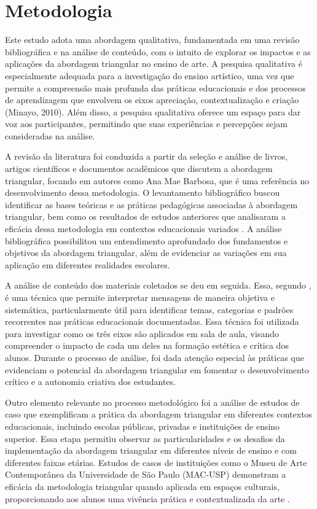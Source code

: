 \documentclass[portuguese]{textolivre}
\begin{document}
\section{Metodologia}\label{sec-conduta}
Este estudo adota uma abordagem qualitativa, fundamentada em uma revisão bibliográfica e na análise de conteúdo, com o intuito de explorar os impactos e as aplicações da abordagem triangular no ensino de arte. A pesquisa qualitativa é especialmente adequada para a investigação do ensino artístico, uma vez que permite a compreensão mais profunda das práticas educacionais e dos processos de aprendizagem que envolvem os eixos apreciação, contextualização e criação (Minayo, 2010). Além disso, a pesquisa qualitativa oferece um espaço para dar voz aos participantes, permitindo que suas experiências e percepções sejam consideradas na análise.

A revisão da literatura foi conduzida a partir da seleção e análise de livros, artigos científicos e documentos acadêmicos que discutem a abordagem triangular, focando em autores como Ana Mae Barbosa, que é uma referência no desenvolvimento dessa metodologia. O levantamento bibliográfico buscou identificar as bases teóricas e as práticas pedagógicas associadas à abordagem triangular, bem como os resultados de estudos anteriores que analisaram a eficácia dessa metodologia em contextos educacionais variados \cite{barbosa2010arte,hernandez2000educacao}. A análise bibliográfica possibilitou um entendimento aprofundado dos fundamentos e objetivos da abordagem triangular, além de evidenciar as variações em sua aplicação em diferentes realidades escolares.

A análise de conteúdo dos materiais coletados se deu em seguida. Essa, segundo \textcite{bardin2011analise}, é uma técnica que permite interpretar mensagens de maneira objetiva e sistemática, particularmente útil para identificar temas, categorias e padrões recorrentes nas práticas educacionais documentadas. Essa técnica foi utilizada para investigar como os três eixos são aplicados em sala de aula, visando compreender o impacto de cada um deles na formação estética e crítica dos alunos. Durante o processo de análise, foi dada atenção especial às práticas que evidenciam o potencial da abordagem triangular em fomentar o desenvolvimento crítico e a autonomia criativa dos estudantes.

Outro elemento relevante no processo metodológico foi a análise de estudos de caso que exemplificam a prática da abordagem triangular em diferentes contextos educacionais, incluindo escolas públicas, privadas e instituições de ensino superior. Essa etapa permitiu observar as particularidades e os desafios da implementação da abordagem triangular em diferentes níveis de ensino e com diferentes faixas etárias. Estudos de casos de instituições como o Museu de Arte Contemporânea da Universidade de São Paulo (MAC-USP) demonstram a eficácia da metodologia triangular quando aplicada em espaços culturais, proporcionando aos alunos uma vivência prática e contextualizada da arte \cite{barbosa2010arte,lopes2013metodologias}.
\end{document}
